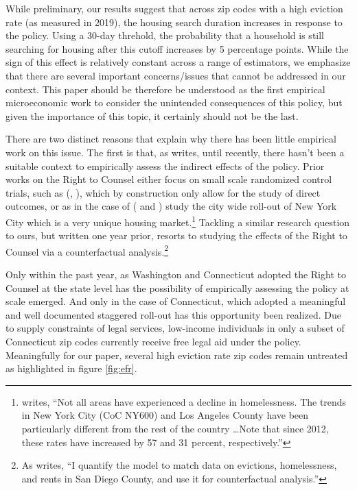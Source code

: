 \documentclass[a4paper,12pt]{article}
\begin{document}
While preliminary, our results suggest that across zip codes with a high eviction rate (as measured in 2019), the housing search duration increases in response to the policy. Using a 30-day threhold, the probability that a household is still searching for housing after this cutoff increases by 5 percentage points. While the sign of this effect is relatively constant across a range of estimators, we emphasize that there are several important concerns/issues that cannot be addressed in our context. This paper should be therefore be understood as the first empirical microeconomic work to consider the unintended consequences of this policy, but given the importance of this topic, it certainly should not be the last.

There are two distinct reasons that explain why there has been little empirical work on this issue. The first is that, as \cite{abramson2021welfare} writes, until recently, there hasn't been a suitable context to empirically assess the indirect effects of the policy. Prior works on the Right to Counsel either focus on small scale randomized control trials, such as (\cite{greiner2012limits}, \cite{seron2001impact}), which by construction only allow for the study of direct outcomes, or as in the case of (\cite{cassidy2022effects} and \cite{ellen2021lawyers}) study the city wide roll-out of New York City which is a very unique housing market.\footnote{\cite{evans2019reducing} writes, ``Not all areas have experienced a decline in homelessness. The trends in New York City (CoC NY600) and Los Angeles County have been particularly different from the rest of the country \dots Note that since 2012, these rates have increased by 57 and 31 percent, respectively.''} Tackling a similar research question to ours, but written one year prior,  \cite{abramson2021welfare} resorts to studying the effects of the Right to Counsel via a counterfactual analysis.\footnote{As \cite{abramson2021welfare} writes, ``I quantify the model to match data on evictions, homelessness, and rents in San Diego
County, and use it for counterfactual analysis.''}\par Only within the past year, as Washington and Connecticut adopted the Right to Counsel at the state level has the possibility of empirically assessing the policy at scale emerged. And only in the case of Connecticut, which adopted a meaningful and well documented staggered roll-out has this opportunity been realized. Due to supply constraints of legal services, low-income individuals in only a subset of Connecticut zip codes currently receive free legal aid under the policy. Meaningfully for our paper, several high eviction rate zip codes remain untreated as highlighted in figure \ref{fig:efr}.\par 
\end{document}
